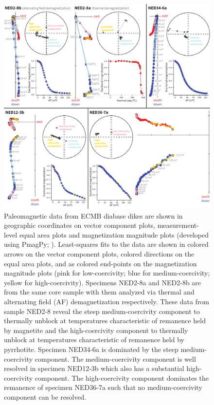 \documentclass[draft]{agujournal2019}
\begin{document}
\begin{figure}[!ht]
\noindent\includegraphics[width=\textwidth]{./figures/paleomag_data.pdf}
\caption{\small{Paleomagnetic data from ECMB diabase dikes are shown in geographic coordinates on vector component plots, measurement-level equal area plots and magnetization magnitude plots (developed using PmagPy; ). Least-squares fits to the data are shown in colored arrows on the vector component plots, colored directions on the equal area plots, and as colored end-points on the magnetization magnitude plots (pink for low-coercivity; blue for medium-coercivity; yellow for high-coercivity). Specimens NED2-8a and NED2-8b are from the same core sample with them analyzed via thermal and alternating field (AF) demagnetization respectively. These data from sample NED2-8 reveal the steep medium-coercivity component to thermally unblock at temperatures characteristic of remanence held by magnetite and the high-coercivity component to thermally unblock at temperatures characteristic of remanence held by pyrrhotite. Specimen NED34-6a is dominated by the steep medium-coercivity component. The medium-coercivity component is well resolved in specimen NED12-3b which also has a substantial high-coercivity component. The high-coercivity component dominates the remanence of specimen NED36-7a such that no medium-coercivity component can be resolved.}}
\label{fig:example_pmag}
\end{figure}
\end{document}
